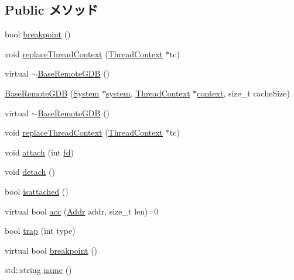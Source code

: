 \subsection*{Public メソッド}
\begin{DoxyCompactItemize}
\item 
bool \hyperlink{classBaseRemoteGDB_ae59ed2201db88c0668ca26040f6a3ad0}{breakpoint} ()
\item 
void \hyperlink{classBaseRemoteGDB_a36909ca9ba5d0978fe30241da42a0e10}{replaceThreadContext} (\hyperlink{classThreadContext}{ThreadContext} $\ast$tc)
\item 
virtual \hyperlink{classBaseRemoteGDB_a04bcb8fd2ed15acbabc951b9a2714870}{$\sim$BaseRemoteGDB} ()
\item 
\hyperlink{classBaseRemoteGDB_a4adca95cc66bef1431e337cc867edf2d}{BaseRemoteGDB} (\hyperlink{classSystem}{System} $\ast$\hyperlink{classBaseRemoteGDB_af27ccd765f13a4b7bd119dc7579e2746}{system}, \hyperlink{classThreadContext}{ThreadContext} $\ast$\hyperlink{classBaseRemoteGDB_a9684dd9218c7836517670f8a0d8f3df7}{context}, size\_\-t cacheSize)
\item 
virtual \hyperlink{classBaseRemoteGDB_a8d9c4468359ca2d976af78ac0c15c0ec}{$\sim$BaseRemoteGDB} ()
\item 
void \hyperlink{classBaseRemoteGDB_a36909ca9ba5d0978fe30241da42a0e10}{replaceThreadContext} (\hyperlink{classThreadContext}{ThreadContext} $\ast$tc)
\item 
void \hyperlink{classBaseRemoteGDB_a9b8a915c2058dbc784c223ff9b93f1a5}{attach} (int \hyperlink{classBaseRemoteGDB_a6f8059414f0228f0256115e024eeed4b}{fd})
\item 
void \hyperlink{classBaseRemoteGDB_ac295bade8aee589f6718dfa79edc2a34}{detach} ()
\item 
bool \hyperlink{classBaseRemoteGDB_ab1d071ce59a596e7db67b12d384469cc}{isattached} ()
\item 
virtual bool \hyperlink{classBaseRemoteGDB_ac0968a34e271b194ce3e808a2252d6a3}{acc} (\hyperlink{base_2types_8hh_af1bb03d6a4ee096394a6749f0a169232}{Addr} addr, size\_\-t len)=0
\item 
bool \hyperlink{classBaseRemoteGDB_a24d0c1ce5672f7476a707b0cef30386d}{trap} (int type)
\item 
virtual bool \hyperlink{classBaseRemoteGDB_aa9fdfc3926a9047bc0fb3d7b13030064}{breakpoint} ()
\item 
std::string \hyperlink{classBaseRemoteGDB_aa62b508d2c0e7d9cec12924965276eb5}{name} ()
\end{DoxyCompactItemize}
